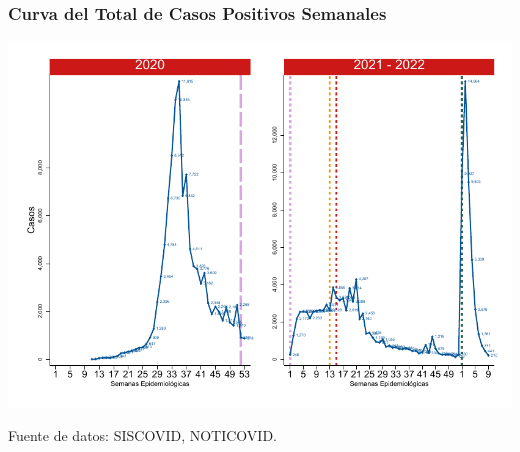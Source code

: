 \documentclass[xcolor=table]{beamer}
\begin{document}
	\begin{frame}[label=epi_cusco]
		\frametitle{Curva del Total de Casos Positivos Semanales}
		\vspace{-.5cm}
		\begin{center}
			\includegraphics[width=.9\linewidth]{../figuras/positivos_20_21_22.pdf}
		\end{center}
		{\tiny Fuente de datos: SISCOVID, NOTICOVID.} \\
	\end{frame}
	
\end{document}
